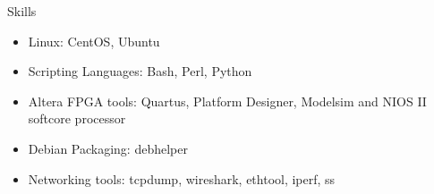 \documentclass[10pt,a4paper]{article}
\begin{document}
{\begin{tcolorbox}

  {\selectfont
    \begin{center}
      \LARGE{Skills}
    \end{center}
  }

  \tcblower

  \large
  \begin{multicols}{2}
  \begin{itemize}[noitemsep]
    \item{Linux: CentOS, Ubuntu}
    \item{Scripting Languages: Bash, Perl, Python}
    \item{Altera FPGA tools: Quartus, Platform Designer, Modelsim and NIOS II softcore processor}
    \item{Debian Packaging: debhelper}
    \item{Networking tools: tcpdump, wireshark, ethtool, iperf, ss}
  \end{itemize}
  \end{multicols}

\end{tcolorbox}

}
\end{document}
